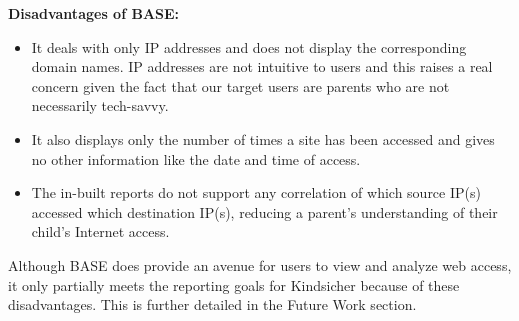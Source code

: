 \textbf{Disadvantages of BASE:}
\begin{itemize}

\item It deals with only IP addresses and does not display the
  corresponding domain names.
  IP addresses are not intuitive to users and this raises a real
  concern given the fact that our target users are parents who are not
  necessarily tech-savvy.

\item It also displays only the number of times a site has been
  accessed and gives no other information like the date and time of
  access.

\item The in-built reports do not support any correlation of which
  source IP(s) accessed which destination IP(s), reducing a parent's
  understanding of their child's Internet access.

\end{itemize}

Although BASE does provide an avenue for users to view and analyze web
access, it only partially meets the reporting goals for
Kindsicher because of these disadvantages.
%
This is further detailed in the Future Work section.
%



